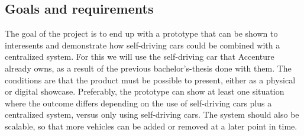 \subsection{Goals and requirements}
The goal of the project is to end up with a prototype that can be shown to interesents and demonstrate how self-driving cars could be combined with a centralized system. For this we will use the self-driving car that Accenture already owns, as a result of the previous bachelor's-thesis done with them. The conditions are that the product must be possible to present, either as a physical or digital showcase. Preferably, the prototype can show at least one situation where the outcome differs depending on the use of self-driving cars plus a centralized system, versus only using self-driving cars. The system should also be scalable, so that more vehicles can be added or removed at a later point in time. 